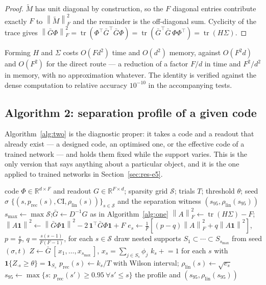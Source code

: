 \documentclass[preprint,12pt]{elsarticle}
\theoremstyle{definition}
\newcommand{\R}{\mathbb{R}}
\newcommand{\norm}[1]{\left\lVert #1 \right\rVert}
\begin{document}
\begin{proof}
$\widetilde M$ has unit diagonal by construction, so the $F$ diagonal entries contribute
exactly $F$ to $\norm{\widetilde M}_F^2$ and the remainder is the off-diagonal sum. Cyclicity
of the trace gives $\norm{\bar G\Phi}_F^2=\operatorname{tr}(\Phi^{\top}\bar G^{\top}\bar
G\Phi)=\operatorname{tr}(\bar G^{\top}\bar G\,\Phi\Phi^{\top})=\operatorname{tr}(H\Sigma)$.
\end{proof}

Forming $H$ and $\Sigma$ costs $O(Fd^2)$ time and $O(d^2)$ memory, against $O(F^2d)$ and
$O(F^2)$ for the direct route --- a reduction of a factor $F/d$ in time and $F^2/d^2$ in
memory, with no approximation whatever. The identity is verified against the dense computation
to relative accuracy $10^{-10}$ in the accompanying tests.

\subsection{Algorithm 2: separation profile of a given code}

Algorithm~\ref{alg:two} is the diagnostic proper: it takes a code and a readout that already
exist --- a designed code, an optimised one, or the effective code of a trained network --- and
holds them fixed while the support varies. This is the only version that says anything about a
particular object, and it is the one applied to trained networks in
Section~\ref{sec:res-e5}.

\begin{algorithm}[t]
\caption{\textsc{SeparationProfile} --- support recovery versus irreducible analog error, on a
fixed code}
\label{alg:two}
\begin{algorithmic}[1]
\Require code $\Phi\in\R^{d\times F}$ and readout $G\in\R^{F\times d}$; sparsity grid
  $\mathcal S$; trials $T$; threshold $\theta$; seed $\sigma$
\Ensure $\{(s,p_{\mathrm{rec}}(s),\text{CI},\rho_{\mathrm{lin}}(s))\}_{s\in\mathcal S}$ and the
  separation witness $(s_{95},\rho_{\mathrm{lin}}(s_{95}))$
\State $s_{\max}\gets\max\mathcal S$;\quad $\bar G\gets D^{-1}G$ as in
  Algorithm~\ref{alg:one}
\State $\norm{A}_F^2\gets\operatorname{tr}(H\Sigma)-F$;\quad
       $\norm{A\mathbf 1}^2\gets\norm{\bar G\Phi\mathbf 1}^2
       -2\,\mathbf 1^{\top}\bar G\Phi\mathbf 1+F$
\State $e_s\gets\frac1F\!\left[(p-q)\norm{A}_F^2+q\norm{A\mathbf 1}^2\right]$,
  $p=\tfrac sF$, $q=\tfrac{s(s-1)}{F(F-1)}$, for each $s\in\mathcal S$
  \State draw nested supports $S_1\subset\cdots\subset S_{s_{\max}}$ from seed $(\sigma,t)$
  \State $Z\gets\bar G\,[\,x_1,\dots,x_{s_{\max}}\,]$, $x_s=\sum_{j\in S_s}\phi_j$
  \State $k_s\mathrel{+}=1$ for each $s$ with $\mathbf 1\{Z_{\cdot s}\ge\theta\}=\mathbf 1_{S_s}$
\EndFor
\State $p_{\mathrm{rec}}(s)\gets k_s/T$ with Wilson interval;\quad
       $\rho_{\mathrm{lin}}(s)\gets\sqrt{e_s}$
\State $s_{95}\gets\max\{s:\ p_{\mathrm{rec}}(s')\ge0.95\ \forall s'\le s\}$
\State \Return the profile and $(s_{95},\rho_{\mathrm{lin}}(s_{95}))$
\end{algorithmic}
\end{algorithm}
\end{document}
